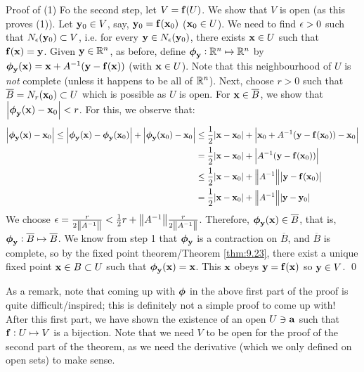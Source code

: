 \begin{nblank}{Proof of (1)}
    Fo the second step, let $V = \mathbf{f}(U)$. We show that $V$ is open (as this proves (1)). Let $\mathbf{y}_0 \in V$, say, $\mathbf{y}_0 = \mathbf{f}(\mathbf{x}_0)$ ($\mathbf{x}_0 \in U$). We need to find $\epsilon > 0$ such that $N_\epsilon(\mathbf{y}_0) \subset V$, i.e. for every $\mathbf{y} \in N_\epsilon(\mathbf{y}_0)$, there exists $\mathbf{x} \in U$ such that $\mathbf{f}(\mathbf{x}) = \mathbf{y}$. Given $\mathbf{y} \in \mathbb{R}^n$, as before, define $\mbox{\boldmath$ \phi $}_{\mathbf{y}}: \mathbb{R}^n \mapsto \mathbb{R}^n$ by $\mbox{\boldmath$ \phi $}_{\mathbf{y}}(\mathbf{x}) = \mathbf{x} + A^{-1}(\mathbf{y} - \mathbf{f}(\mathbf{x}))$ (with $\mathbf{x} \in U$). Note that this neighbourhood of $U$ is \emph{not} complete (unless it happens to be all of $\mathbb{R}^n$). Next, choose $r > 0$ such that $\overline{B} = N_r(\mathbf{x}_0) \subset U$ which is possible as $U$ is open. For $\mathbf{x} \in \overline{B}$, we show that $\abs{\mbox{\boldmath$ \phi $}_{\mathbf{y}}(\mathbf{x}) - \mathbf{x}_0} < r$. For this, we observe that:
    \begin{align*}
        \abs{\mbox{\boldmath$ \phi $}_{\mathbf{y}}(\mathbf{x}) - \mathbf{x}_0} \leq \abs{\mbox{\boldmath$ \phi $}_{\mathbf{y}}(\mathbf{x}) - \mbox{\boldmath$ \phi $}_{\mathbf{y}}(\mathbf{x}_0)} + \abs{\mbox{\boldmath$ \phi $}_{\mathbf{y}}(\mathbf{x}_0) - \mathbf{x}_0}
        &\leq \frac{1}{2}\abs{\mathbf{x} - \mathbf{x}_0} + \abs{\mathbf{x}_0 + A^{-1}(\mathbf{y} - \mathbf{f}(\mathbf{x}_0)) - \mathbf{x}_0}
        \\ &= \frac{1}{2}\abs{\mathbf{x} - \mathbf{x}_0} + \abs{A^{-1}(\mathbf{y} - \mathbf{f}(\mathbf{x}_0))}
        \\ &\leq \frac{1}{2}\abs{\mathbf{x} - \mathbf{x}_0} + \norm{A^{-1}}\abs{\mathbf{y} - \mathbf{f}(\mathbf{x}_0)}
        \\ &= \frac{1}{2}\abs{\mathbf{x} - \mathbf{x}_0} + \norm{A^{-1}}\abs{\mathbf{y} - \mathbf{y}_0}
    \end{align*}
    We choose $\epsilon = \frac{r}{2\norm{A^{-1}}} < \frac{1}{2}r + \norm{A^{-1}}\frac{r}{2\norm{A^{-1}}}$. Therefore, $\mbox{\boldmath$ \phi $}_{\mathbf{y}}(\mathbf{x}) \in \overline{B}$, that is, $\mbox{\boldmath$ \phi $}_{\mathbf{y}}: \overline{B} \mapsto \overline{B}$. We know from step 1 that $\mbox{\boldmath$ \phi $}_{\mathbf{y}}$ is a contraction on $\overline{B}$, and $\overline{B}$ is complete, so by the fixed point theorem/Theorem \ref{thm:9.23}, there exist a unique fixed point $\mathbf{x} \in B \subset U$ such that $\mbox{\boldmath$ \phi $}_{\mathbf{y}}(\mathbf{x}) = \mathbf{x}$. This $\mathbf{x}$ obeys $\mathbf{y} = \mathbf{f}(\mathbf{x})$ so $\mathbf{y} \in V$. \qed
\end{nblank}

\noindent As a remark, note that coming up with $\mbox{\boldmath$ \phi $}$ in the above first part of the proof is quite difficult/inspired; this is definitely not a simple proof to come up with! After this first part, we have shown the existence of an open $U \ni \mathbf{a}$ such that $\mathbf{f}: U \mapsto V$ is a bijection. Note that we need $V$ to be open for the proof of the second part of the theorem, as we need the derivative (which we only defined on open sets) to make sense.

